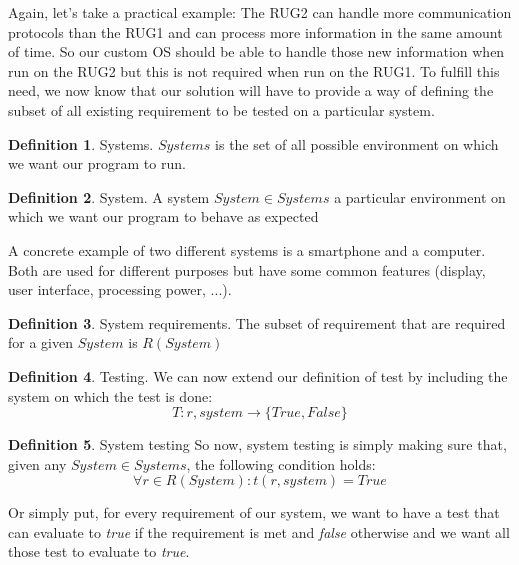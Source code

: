 \documentclass[12pt]{article}
\theoremstyle{definition}
\newtheorem{definition}{Definition}[section]
\theoremstyle{definition}
\theoremstyle{remark}
\begin{document}
Again, let's take a practical example: The RUG2 can handle more communication protocols than the RUG1 and can process more information in the same amount of time. So our custom OS should be able to handle those new information when run on the RUG2 but this is not required when run on the RUG1. To fulfill this need, we now know that our solution will have to provide a way of defining the subset of all existing requirement to be tested on a particular system.\\

\theoremstyle{definition}
\begin{definition}{Systems.} $Systems$ is the set of all possible environment on which we want our program to run.
\end{definition}

\theoremstyle{definition}
\begin{definition}{System.} A system $System \in Systems$ a particular environment on which we want our program to behave as expected
\end{definition}

A concrete example of two different systems is a smartphone and a computer. Both are used for different purposes but have some common features (display, user interface, processing power, ...).

\theoremstyle{definition}
\begin{definition}{System requirements.} The subset of requirement that are required for a given $System$ is $R(System)$
\end{definition}

\theoremstyle{definition}
\begin{definition}{Testing.} We can now extend our definition of test by including the system on which the test is done:
$$T: r, system \to \{True, False\}$$
\end{definition}

\theoremstyle{definition}
\begin{definition}{System testing} So now, system testing is simply making sure that, given any $System \in Systems$, the following condition holds:
$$
\forall r \in R(System): t(r, system) = True
$$
\end{definition}

Or simply put, for every requirement of our system, we want to have a test that can evaluate to \textit{true} if the requirement is met and \textit{false} otherwise and we want all those test to evaluate to \textit{true}.


\end{document}
